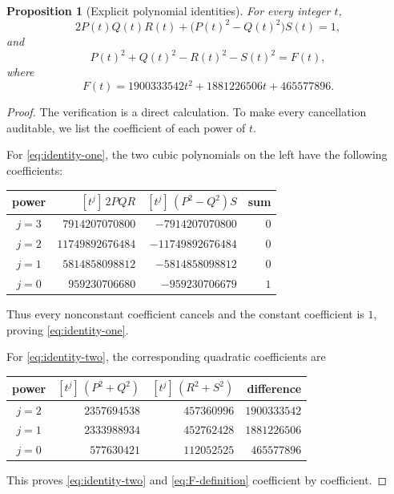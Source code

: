 \documentclass[11pt]{article}
\newtheorem{proposition}[proposition]{Proposition}
\theoremstyle{remark}
\begin{document}
\begin{proposition}[Explicit polynomial identities]\label{prop:poly-identities}
For every integer $t$,
\begin{equation}\label{eq:identity-one}
 2P(t)Q(t)R(t)+\bigl(P(t)^2-Q(t)^2\bigr)S(t)=1,
\end{equation}
and
\begin{equation}\label{eq:identity-two}
 P(t)^2+Q(t)^2-R(t)^2-S(t)^2=F(t),
\end{equation}
where
\begin{equation}\label{eq:F-definition}
 F(t)=1900333542t^2+1881226506t+465577896.
\end{equation}
\end{proposition}

\begin{proof}
The verification is a direct calculation.  To make every cancellation auditable, we list the coefficient of each power of $t$.

For \eqref{eq:identity-one}, the two cubic polynomials on the left have the following coefficients:
\begin{center}
\small
\begin{tabular}{c r r r}
\toprule
power & $[t^j]\,2PQR$ & $[t^j]\,(P^2-Q^2)S$ & sum \\
\midrule
$j=3$ & $ 7914207070800$ & $-7914207070800$ & $0$ \\
$j=2$ & $11749892676484$ & $-11749892676484$ & $0$ \\
$j=1$ & $ 5814858098812$ & $-5814858098812$ & $0$ \\
$j=0$ & $  959230706680$ & $ -959230706679$ & $1$ \\
\bottomrule
\end{tabular}
\end{center}
Thus every nonconstant coefficient cancels and the constant coefficient is $1$, proving \eqref{eq:identity-one}.

For \eqref{eq:identity-two}, the corresponding quadratic coefficients are
\begin{center}
\small
\begin{tabular}{c r r r}
\toprule
power & $[t^j]\,(P^2+Q^2)$ & $[t^j]\,(R^2+S^2)$ & difference \\
\midrule
$j=2$ & $2357694538$ & $457360996$ & $1900333542$ \\
$j=1$ & $2333988934$ & $452762428$ & $1881226506$ \\
$j=0$ & $ 577630421$ & $112052525$ & $ 465577896$ \\
\bottomrule
\end{tabular}
\end{center}
This proves \eqref{eq:identity-two} and \eqref{eq:F-definition} coefficient by coefficient.
\end{proof}
\end{document}
